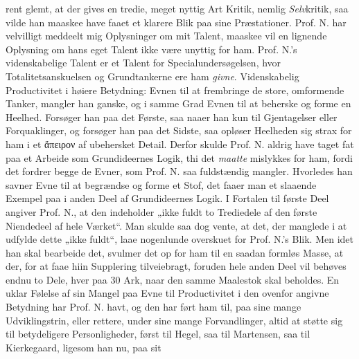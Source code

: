 \documentclass[12pt,a4paper]{book}
\newcommand{\opage}[1]{\marginnote{\footnotesize\textit{[#1]}}}
\begin{document}
rent glemt, at der gives en tredie, meget nyttig Art Kritik, nemlig
\emph{Selv}kritik, saa vilde han maaskee have faaet et klarere Blik paa sine
Præstationer. Prof. N. har velvilligt meddeelt mig Oplysninger om mit Talent,
maaskee vil en lignende Oplysning om hans eget Talent ikke være unyttig for ham.
Prof. N.'s videnskabelige Talent er et Talent for Specialundersøgelsen, hvor
Totalitetsanskuelsen og Grundtankerne ere ham \emph{givne}. Videnskabelig
Productivitet i høiere Betydning: Evnen til at frembringe de store, omformende
Tanker, mangler han ganske, og i samme Grad Evnen til at beherske og forme en
Heelhed. Forsøger han paa det Første, saa naaer han kun til Gjentagelser eller
Forquaklinger, og forsøger han paa det Sidste, saa opløser Heelheden sig strax
for ham i et ἄπειρον af ubehersket Detail. Derfor skulde Prof. N. aldrig have
taget fat paa et Arbeide som Grundideernes Logik, thi det \emph{maatte}
mislykkes for ham, fordi det fordrer begge de Evner, som Prof. N. saa
fuldstændig mangler. Hvorledes han savner Evne til at begrændse og forme et Stof,
det faaer man et slaaende Exempel paa i anden Deel af Grundideernes Logik. I
Fortalen til første Deel angiver Prof. N., at den indeholder „ikke fuldt to
Trediedele af den første Niendedeel af hele Værket“. Man skulde saa dog vente, at
det, der manglede i at udfylde dette „ikke fuldt“, laae nogenlunde overskuet for
Prof. N.'s Blik. Men idet han skal bearbeide det, svulmer det op for ham til en
saadan formløs Masse, at der, for at faae hiin Supplering tilveiebragt, foruden
hele anden Deel vil behøves endnu to Dele, hver paa 30 Ark, naar den samme
Maalestok skal beholdes. En uklar Følelse af sin Mangel paa Evne
\opage{23} til Productivitet i den ovenfor angivne Betydning har Prof. N. havt, og den har
ført ham til, paa sine mange Udviklingstrin, eller rettere, under sine mange
Forvandlinger, altid at støtte sig til betydeligere Personligheder, først til
Hegel, saa til Martensen, saa til Kierkegaard, ligesom han nu, paa sit
\end{document}
